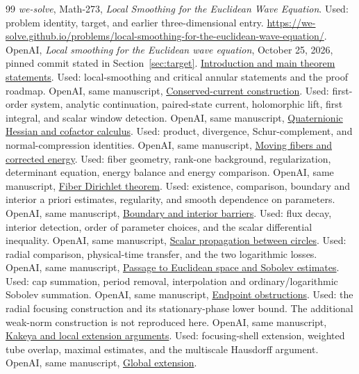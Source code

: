 \documentclass[11pt,a4paper]{article}
\numberwithin{equation}{section}
\theoremstyle{definition}
\theoremstyle{remark}
\newcommand{\repolink}[2]{\href{https://github.com/openai/math/blob/7ef5c0cc5ca4b0e072b7a050fca09ab24bc6fa3a/#1}{#2}}
\newcommand{\mathsource}[2]{\repolink{preprints/Local-smoothing-for-the-Euclidean-wave-equation-October-25-2026/build/sections/#1.tex}{#2}}
\begin{document}
\begin{thebibliography}{99}
 \emph{we-solve}, Math-273, \emph{Local Smoothing for the
Euclidean Wave Equation}. Used: problem identity, target, and earlier
three-dimensional entry. \url{https://we-solve.github.io/problems/local-smoothing-for-the-euclidean-wave-equation/}.
 OpenAI, \emph{Local smoothing for the Euclidean wave equation},
October 25, 2026, pinned commit stated in Section~\ref{sec:target}.
\mathsource{introduction}{Introduction and main theorem statements}.
Used: local-smoothing and critical annular statements and the proof roadmap.
 OpenAI, same manuscript,
\mathsource{current}{Conserved-current construction}.
Used: first-order system, analytic continuation, paired-state current,
holomorphic lift, first integral, and scalar window detection.
 OpenAI, same manuscript,
\mathsource{calculus}{Quaternionic Hessian and cofactor calculus}.
Used: product, divergence, Schur-complement, and normal-compression identities.
 OpenAI, same manuscript,
\mathsource{energy}{Moving fibers and corrected energy}.
Used: fiber geometry, rank-one background, regularization, determinant equation,
energy balance and energy comparison.
 OpenAI, same manuscript,
\mathsource{dirichlet}{Fiber Dirichlet theorem}.
Used: existence, comparison, boundary and interior a priori estimates,
regularity, and smooth dependence on parameters.
 OpenAI, same manuscript,
\mathsource{barrier}{Boundary and interior barriers}.
Used: flux decay, interior detection, order of parameter choices, and the scalar
differential inequality.
 OpenAI, same manuscript,
\mathsource{propagation}{Scalar propagation between circles}.
Used: radial comparison, physical-time transfer, and the two logarithmic losses.
 OpenAI, same manuscript,
\mathsource{transfer}{Passage to Euclidean space and Sobolev estimates}.
Used: cap summation, period removal, interpolation and ordinary/logarithmic
Sobolev summation.
 OpenAI, same manuscript,
\mathsource{sharpness}{Endpoint obstructions}.
Used: the radial focusing construction and its stationary-phase lower bound.
The additional weak-norm construction is not reproduced here.
 OpenAI, same manuscript,
\mathsource{kakeya}{Kakeya and local extension arguments}.
Used: focusing-shell extension, weighted tube overlap, maximal estimates,
and the multiscale Hausdorff argument.
 OpenAI, same manuscript,
\mathsource{global-extension}{Global extension}.

\end{thebibliography}
\end{document}
